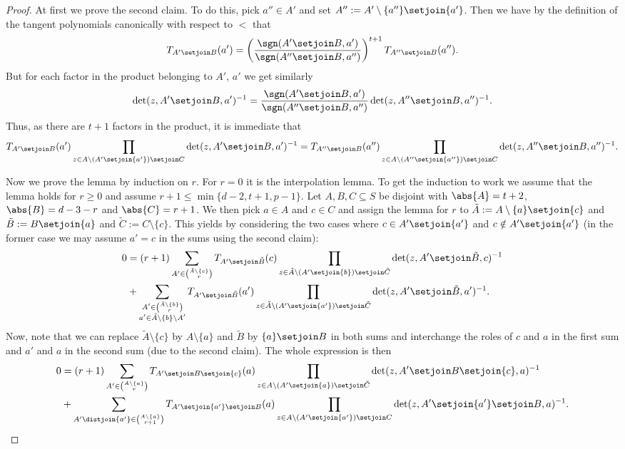 \message{ !name(OnTheRAIDProblem.tex)}\documentclass[8pt,a4paper]{article}
\begin{document}
\begin{proof}
At first we prove the second claim. To do this, pick $a''\in A'$ and
set $A'':=A'\setminus\{a''\}\setjoin\{a'\}$. Then we have by the
definition of the tangent polynomials canonically with respect to $<$ that
\begin{equation}
T_{A'\setjoin B}(a') = \left(\frac{\sgn(A'\setjoin B,a')}{\sgn(A''\setjoin B,a'')}\right)^{t+1}T_{A''\setjoin B}(a'')\text{.}
\end{equation}
But for each factor in the product belonging to $A'$, $a'$ we get similarly
\begin{equation}
\det(z,A'\setjoin B,a')^{-1}=\frac{\sgn(A'\setjoin B,a')}{\sgn(A''\setjoin B,a'')}\det(z,A''\setjoin B,a'')^{-1}\text{.}
\end{equation}
Thus, as there are $t+1$ factors in the product, it is immediate that 
\begin{align*}
T_{A'\setjoin B}(a')\prod_{z\in A\setminus (A'\setjoin\{a'\})\setjoin C}\det(z,A'\setjoin B,a')^{-1} = T_{A''\setjoin B}(a'')\prod_{z\in A\setminus (A''\setjoin\{a''\})\setjoin C}\det(z,A''\setjoin B,a'')^{-1}\text{.}
\end{align*}

Now we prove the lemma by induction on $r$. For $r=0$ it is the interpolation lemma.
To get the induction to work we assume that the lemma holds for $r\geq 0$ and assume $r+1\leq\min\{d-2,t+1,p-1\}$.
Let $A,B,C\subseteq S$ be disjoint with $\abs{A}=t+2$, $\abs{B}=d-3-r$ and $\abs{C}=r+1$. We then pick $a\in A$ and $c\in C$ and assign the lemma for $r$ to
$\tilde{A}:=A\setminus\{a\}\setjoin\{c\}$ and $\tilde{B}:=B\setjoin\{a\}$ and $\tilde{C}:=C\setminus\{c\}$. 
This yields by considering the two cases where $c\in A'\setjoin\{a'\}$ and $c\notin A'\setjoin\{a'\}$ (in the former case we may assume $a'=c$ in the sums using the second claim):
\begin{align}
0 & = (r+1)\sum_{A'\in\binom{\tilde{A}\setminus\{c\}}{r}}{T_{A'\setjoin\tilde{B}}(c)\prod_{z\in \tilde{A}\setminus (A'\setjoin\{b\})\setjoin \tilde{C}}\det(z,A'\setjoin\tilde{B},c)^{-1}}\\
& + \sum_{\substack{A'\in\binom{\tilde{A}\setminus\{b\}}{r}\\ a'\in \tilde{A}\setminus\{b\}\setminus A'}}{T_{A'\setjoin\tilde{B}}(a')\prod_{z\in \tilde{A}\setminus (A'\setjoin\{a'\})\setjoin \tilde{C}}\det(z,A'\setjoin\tilde{B},a')^{-1}}\text{.}
\end{align}
Now, note that we can replace $\tilde{A}\setminus \{c\}$ by $A\setminus\{a\}$ and $\tilde{B}$ by $\{a\}\setjoin B$ in both sums and interchange the roles of $c$ and $a$ in the first sum and $a'$ and $a$ in the second sum (due to the second claim). The whole expression is then
\begin{align}
0 & = (r+1)\sum_{A'\in\binom{A\setminus\{a\}}{r}}{T_{A'\setjoin B\setjoin\{c\}}(a)\prod_{z\in A\setminus (A'\setjoin \{a\})\setjoin\tilde{C}}{\det(z,A'\setjoin B\setjoin\{c\},a)^{-1}}}\\
& + \sum_{A'\distjoin\{a'\}\in\binom{A\setminus\{a\}}{r+1}}{T_{A'\setjoin\{a'\}\setjoin B}(a)\prod_{z\in A\setminus (A'\setjoin\{a'\})\setjoin C}{\det(z,A'\setjoin\{a'\}\setjoin B,a)^{-1}}}\text{.}
\end{align}


\end{proof}
\end{document}
